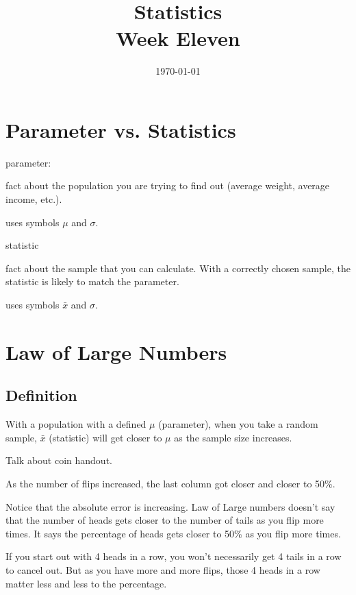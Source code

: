 \documentclass[letterpaper,landscape]{exam}
\title{Statistics \\ Week Eleven}
\date{\today}
\author{}
\begin{document}
  \maketitle
  \tableofcontents

  \newpage

  \section{Parameter vs. Statistics}

  parameter:
  \begin{itemize*} 
    \item fact about the population you are trying to find out (average
      weight, average income, etc.). 
    \item uses symbols $\mu$ and $\sigma$.
  \end{itemize*}

  statistic
  \begin{itemize*} 
    \item fact about the sample that you can calculate. With a
      correctly chosen sample, the statistic is likely to match the
      parameter.
    \item uses symbols $\bar{x}$ and $\sigma$.
  \end{itemize*}

  \section{Law of Large Numbers}

  \subsection{Definition}
  With a population with a defined $\mu$ (parameter), when you take a random sample,
  $\bar{x}$ (statistic) will get closer to $\mu$ as the sample size increases.

  Talk about coin handout.

  As the number of flips increased, the last column got closer and closer to 50\%.

  Notice that the absolute error is increasing. Law of Large numbers doesn't say that the number of
  heads gets closer to the number of tails as you flip more times. It says the percentage of heads
  gets closer to 50\% as you flip more times.

  If you start out with 4 heads in a row, you won't necessarily get 4 tails in a row to cancel out.
  But as you have more and more flips, those 4 heads in a row matter less and less to the
  percentage.
\end{document}
